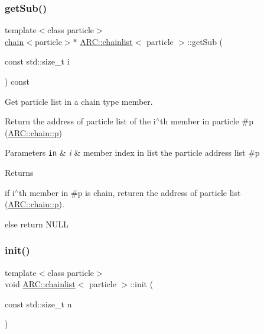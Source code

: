 \subsubsection{\texorpdfstring{get\+Sub()}{getSub()}}
{\footnotesize\ttfamily template$<$class particle$>$ \\
\hyperlink{classARC_1_1chain}{chain}$<$particle$>$$\ast$ \hyperlink{classARC_1_1chainlist}{A\+R\+C\+::chainlist}$<$ particle $>$\+::get\+Sub (\begin{DoxyParamCaption}\item[{const std\+::size\+\_\+t}]{i }\end{DoxyParamCaption}) const\hspace{0.3cm}{\ttfamily [inline]}}



Get particle list in a chain type member. 

Return the address of particle list of the i$^\wedge$th member in particle \#p (\hyperlink{classARC_1_1chain_af1793b656e139e1f87c2e0a55f87514b}{A\+R\+C\+::chain\+::p}) 
\begin{DoxyParams}[1]{Parameters}
\mbox{\tt in}  & {\em i} & member index in list the particle address list \#p \\
\hline
\end{DoxyParams}
\begin{DoxyReturn}{Returns}

\begin{DoxyItemize}
\item if i$^\wedge$th member in \#p is chain, returen the address of particle list (\hyperlink{classARC_1_1chain_af1793b656e139e1f87c2e0a55f87514b}{A\+R\+C\+::chain\+::p}).
\item else return N\+U\+LL 
\end{DoxyItemize}
\end{DoxyReturn}
\hypertarget{classARC_1_1chainlist_a84a2c65edf27bd25254e188ebf7d5dce}{}\label{classARC_1_1chainlist_a84a2c65edf27bd25254e188ebf7d5dce} 
\subsubsection{\texorpdfstring{init()}{init()}}
{\footnotesize\ttfamily template$<$class particle$>$ \\
void \hyperlink{classARC_1_1chainlist}{A\+R\+C\+::chainlist}$<$ particle $>$\+::init (\begin{DoxyParamCaption}\item[{const std\+::size\+\_\+t}]{n }\end{DoxyParamCaption})\hspace{0.3cm}{\ttfamily [inline]}}



